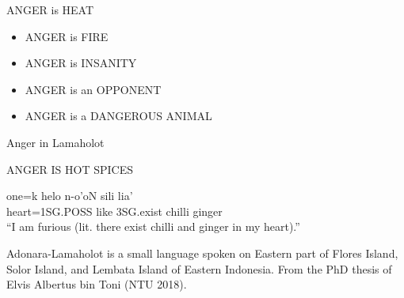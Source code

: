 \begin{frame}[allowframebreaks]{ANGER is HEAT}
\begin{itemize}
\begin{itemize}
\item ANGER is FIRE
\item ANGER is INSANITY
\item ANGER is an OPPONENT
\item ANGER is a DANGEROUS ANIMAL
\end{itemize}

\end{itemize}


\end{frame}

\begin{frame}{Anger in Lamaholot}

ANGER IS HOT SPICES
\begin{exe}
  \ex \gll one=k helo n-o'oN sili lia' \\
heart=1SG.POSS like 3SG.exist chilli ginger \\
\trans ``I am furious (lit. there exist chilli and ginger in my heart).''
\end{exe}

Adonara-Lamaholot is a small language spoken on Eastern part of Flores
Island, Solor Island, and Lembata Island of Eastern Indonesia.   From
the PhD thesis of Elvis Albertus bin Toni (NTU 2018).  

\end{frame}